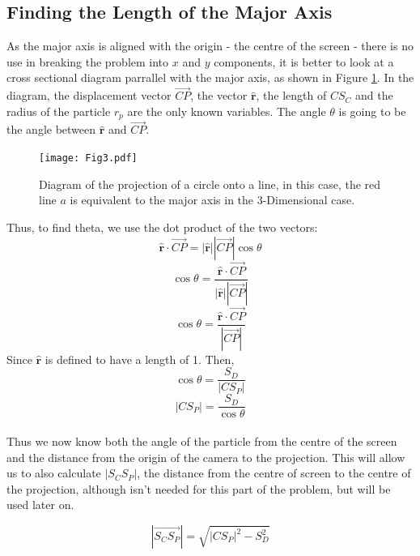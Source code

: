 \documentclass{article}
\newcommand\ddd{{3-Dimensional}\xspace}
\newcommand\ru{\hat{\mathbf{r}}\xspace}
\newcommand\cpv{\overrightarrow{CP}\xspace}
\begin{document}
	\subsection{Finding the Length of the Major Axis}
	As the major axis is aligned with the origin - the centre of the screen - there is no use in breaking the problem into $x$ and $y$
	components, it is better to look at a cross sectional diagram parrallel with the major axis, as shown in Figure \ref{fig:majorAxis}.
	In the diagram, the displacement vector $\overrightarrow{CP}$, the vector $\hat{\mathbf{r}}$, the length of $CS_C$ and the radius of the
	particle $r_p$ are the only known variables. The angle $\theta$ is going to be the angle between $\ru$ and $\cpv$.
	\begin{figure}
		\texttt{[image: Fig3.pdf]}
		\caption{Diagram of the projection of a circle onto a line, in this case, the red line $a$ is equivalent to the major axis in the \ddd case.}
		\label{fig:majorAxis}
	\end{figure}
	Thus, to find theta, we use the dot product of the two vectors:
	$$
	\ru \cdot \cpv = |\ru| |\cpv| \cos{\theta} $$ $$
	\cos{\theta} = \frac{\ru \cdot \cpv}{|\ru||\cpv|}
	$$
	\begin{equation}
		\cos{\theta} = \frac{\ru \cdot \cpv}{|\cpv|}
	\end{equation}
	Since $\ru$ is defined to have a length of 1. Then,
	$$\cos{\theta} = \frac{S_D}{|CS_P|} $$
	\begin{equation}
		\left|C S_P\right| = \frac{S_D}{\cos{\theta}}
	\end{equation}
	\paragraph{}
	Thus we now know both the angle of the particle from the centre of the screen and the distance from the origin of the camera to the
	projection. This will allow us to also calculate $|S_C S_P|$, the distance from the centre of screen to the centre
	of the projection, although isn't needed for this part of the problem, but will be used later on.

	$$\left| \overrightarrow{S_C S_P} \right| =\sqrt{ \left|C S_P\right|^2 - S_D ^2}$$
\end{document}
